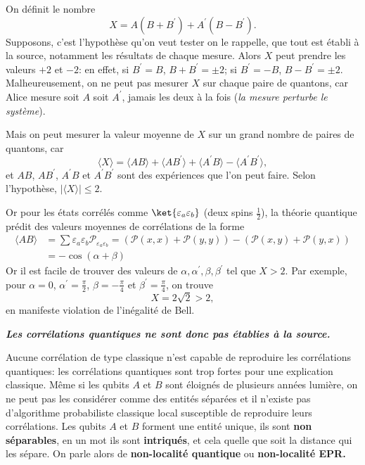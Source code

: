 On définit le nombre%
\begin{equation}
X=A(B+B^{\prime})+A^{\prime}(B-B^{\prime}).
\end{equation}
Supposons, c'est l'hypothèse qu'on veut tester on le rappelle, que tout est
établi à la source, notamment les résultats de chaque mesure. Alors $X$ peut
prendre les valeurs $+2$ et $-2$: en effet, si $B^{\prime}=B$,
$B+B^{\prime}=\pm2$; si $B^{\prime}=-B$, $B-B^{\prime}=\pm2$. Malheureusement,
on ne peut pas mesurer $X$ sur chaque paire de quantons, car Alice mesure soit
$A$ soit $A^{\prime}$, jamais les deux à la fois (\emph{la mesure perturbe le
système}).

Mais on peut mesurer la valeur moyenne de $X$ sur un grand nombre de paires de
quantons, car%
\begin{equation}
\langle X\rangle=\langle AB\rangle+\langle AB^{\prime}\rangle+\langle
A^{\prime}B\rangle -\langle A^{\prime}B^{\prime}\rangle,
\end{equation}
et $AB$, $AB^{\prime}$, $A^{\prime}B$ et $A^{\prime}B^{\prime}$ sont des
expériences que l'on peut faire. Selon l'hypothèse, $|\langle X\rangle|\leq2$.

Or pour les états corrélés comme $\ket{\varepsilon_{a}\varepsilon_{b}}$
(deux spins $\frac{1}{2}$), la théorie quantique prédit des valeurs moyennes de
corrélations de la forme%
\begin{equation}
\begin{split}
\langle AB\rangle & =\sum\varepsilon_{a}\varepsilon_{b}
\mathcal{P}_{\varepsilon_{a}\varepsilon_{b}}=(\mathcal{P}(x,x)+\mathcal{P}%
(y,y))-(\mathcal{P}(x,y)+\mathcal{P}(y,x))\\
& =-\cos(\alpha+\beta)
\end{split}
\end{equation}
Or il est facile de trouver des valeurs de $\alpha,\alpha^{\prime},\beta
,\beta^{\prime}$ tel que $X>2$. Par exemple, pour $\alpha=0$, $\alpha^{\prime
}=\frac{\pi}{2}$, $\beta=-\frac{\pi}{4}$ et $\beta^{\prime}=\frac{\pi}{4}$, on
trouve%
\begin{equation}
X=2\sqrt{2}>2,
\end{equation}
en manifeste violation de l'inégalité de Bell.
\begin{center}
\textbf{\emph{Les corrélations quantiques ne sont donc pas établies à la
source.} }
\end{center}

Aucune corrélation de type classique n'est capable de reproduire les
corrélations quantiques: les corrélations quantiques sont trop fortes pour une
explication classique. Même si les qubits $A$ et $B$ sont éloignés de plusieurs
années lumière, on ne peut pas les considérer comme des entités séparées et il
n'existe pas d'algorithme probabiliste classique local susceptible de reproduire
leurs corrélations. Les qubits $A$ et $B$ forment une entité unique, ils sont
\textbf{non séparables}, en un mot ils sont \textbf{intriqués}, et cela quelle
que soit la distance qui les sépare. On parle alors de \textbf{non-localité
quantique} ou \textbf{non-localité EPR.}

